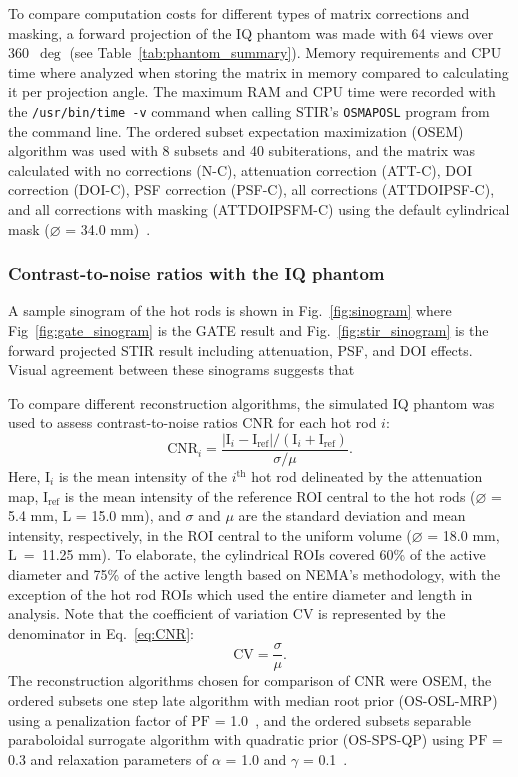 \documentclass[utf8]{FrontiersinHarvard} %
\begin{document}
To compare computation costs for different types of matrix corrections and masking, a forward projection of the IQ phantom was made with 64 views over 360~$\deg$ (see Table~\ref{tab:phantom_summary}). Memory requirements and CPU time where analyzed when storing the matrix in memory compared to calculating it per projection angle. The maximum RAM and CPU time were recorded with the \texttt{/usr/bin/time -v} command when calling STIR's \texttt{OSMAPOSL} program from the command line. The ordered subset expectation maximization (OSEM) algorithm was used with 8 subsets and 40 subiterations, and the matrix was calculated with no corrections (N-C), attenuation correction (ATT-C), DOI correction (DOI-C), PSF correction (PSF-C), all corrections (ATTDOIPSF-C), and all corrections with masking (ATTDOIPSFM-C) using the default cylindrical mask ($\diameter$ = 34.0 mm)~\cite{osem}.

\subsubsection{Contrast-to-noise ratios with the IQ phantom}

A sample sinogram of the hot rods is shown in Fig.~\ref{fig:sinogram} where Fig~\ref{fig:gate_sinogram} is the GATE result and Fig.~\ref{fig:stir_sinogram} is the forward projected STIR result including attenuation, PSF, and DOI effects. Visual agreement between these sinograms suggests that 

To compare different reconstruction algorithms, the simulated IQ phantom was used to assess contrast-to-noise ratios $\mathrm{CNR}$ for each hot rod $i$:
\begin{equation}\label{eq:CNR}
	\mathrm{CNR}_i = \frac{|\mathrm{I}_i - \mathrm{I}_\mathrm{ref}|/(\mathrm{I}_i + \mathrm{I}_\mathrm{ref})}{\sigma / \mu}.
\end{equation}
Here, $\mathrm{I}_i$ is the mean intensity of the $i^\mathrm{th}$ hot rod delineated by the attenuation map, $\mathrm{I}_\mathrm{ref}$ is the mean intensity of the reference ROI central to the hot rods ($\diameter$ = 5.4 mm, $\mathrm{L}$ = 15.0 mm), and $\sigma$ and $\mu$ are the standard deviation and mean intensity, respectively, in the ROI central to the uniform volume ($\diameter$ = 18.0 mm, $\mathrm{L}$~=~11.25 mm). To elaborate, the cylindrical ROIs covered 60\% of the active diameter and 75\% of the active length based on NEMA's methodology, with the exception of the hot rod ROIs which used the entire diameter and length in analysis. Note that the coefficient of variation $\mathrm{CV}$ is represented by the denominator in Eq.~\ref{eq:CNR}:
\begin{equation}\label{eq:CV}
\mathrm{CV} = \frac{\sigma}{\mu}.
\end{equation}
The reconstruction algorithms chosen for comparison of $\mathrm{CNR}$ were OSEM, the ordered subsets one step late algorithm with median root prior (OS-OSL-MRP) using a penalization factor of $\mathrm{PF}$ = 1.0~\cite{ososlmrp}, and the ordered subsets separable paraboloidal surrogate algorithm with quadratic prior (OS-SPS-QP) using $\mathrm{PF}$ = 0.3 and relaxation parameters of $\alpha$ = 1.0 and $\gamma$ = 0.1~\cite{osspsqp}.
\end{document}
